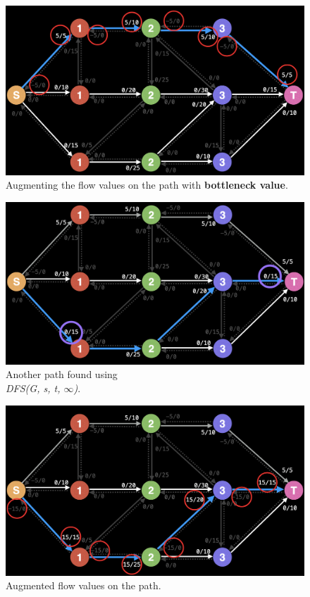 \documentclass{report}
\begin{document}
\begin{figure}[!htb]
    \includegraphics[width=\textwidth]{assets/visual04.png}
    \centering
    \captionsetup{justification=centering,margin=2cm}
    \caption{Augmenting the flow values on the path with \textbf{bottleneck value}.}
\end{figure}
\pagebreak
\begin{figure}[!htb]
    \includegraphics[width=\textwidth]{assets/visual05.png}
    \centering
    \captionsetup{justification=centering,margin=2cm}
    \caption{Another path found using \\\textit{DFS(G, s, t, $\infty$)}.}
\end{figure}
\begin{figure}[!htb]
    \includegraphics[width=\textwidth]{assets/visual06.png}
    \centering
    \captionsetup{justification=centering,margin=2cm}
    \caption{Augmented flow values on the path.}
\end{figure}
\end{document}
